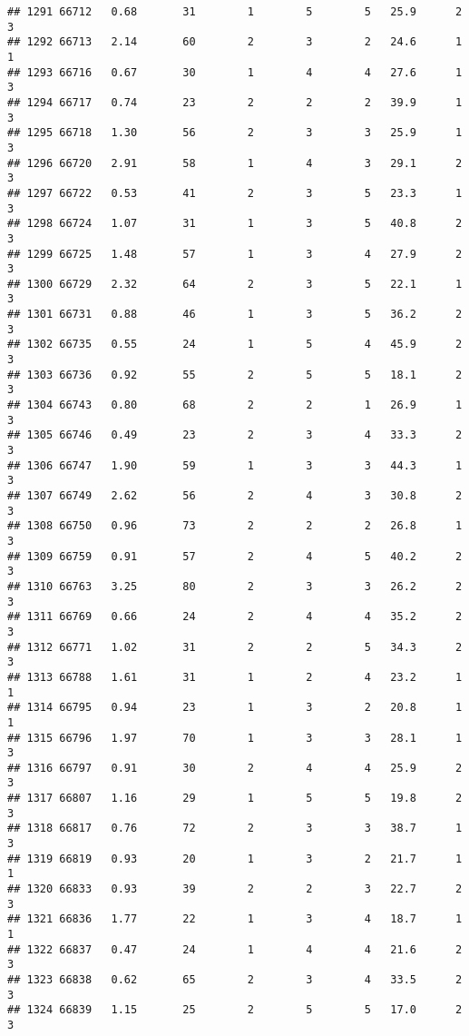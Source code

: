 \documentclass[
]{article}
\begin{document}
\begin{verbatim}
## 1291 66712   0.68       31        1        5        5   25.9      2      3
## 1292 66713   2.14       60        2        3        2   24.6      1      1
## 1293 66716   0.67       30        1        4        4   27.6      1      3
## 1294 66717   0.74       23        2        2        2   39.9      1      3
## 1295 66718   1.30       56        2        3        3   25.9      1      3
## 1296 66720   2.91       58        1        4        3   29.1      2      3
## 1297 66722   0.53       41        2        3        5   23.3      1      3
## 1298 66724   1.07       31        1        3        5   40.8      2      3
## 1299 66725   1.48       57        1        3        4   27.9      2      3
## 1300 66729   2.32       64        2        3        5   22.1      1      3
## 1301 66731   0.88       46        1        3        5   36.2      2      3
## 1302 66735   0.55       24        1        5        4   45.9      2      3
## 1303 66736   0.92       55        2        5        5   18.1      2      3
## 1304 66743   0.80       68        2        2        1   26.9      1      3
## 1305 66746   0.49       23        2        3        4   33.3      2      3
## 1306 66747   1.90       59        1        3        3   44.3      1      3
## 1307 66749   2.62       56        2        4        3   30.8      2      3
## 1308 66750   0.96       73        2        2        2   26.8      1      3
## 1309 66759   0.91       57        2        4        5   40.2      2      3
## 1310 66763   3.25       80        2        3        3   26.2      2      3
## 1311 66769   0.66       24        2        4        4   35.2      2      3
## 1312 66771   1.02       31        2        2        5   34.3      2      3
## 1313 66788   1.61       31        1        2        4   23.2      1      1
## 1314 66795   0.94       23        1        3        2   20.8      1      1
## 1315 66796   1.97       70        1        3        3   28.1      1      3
## 1316 66797   0.91       30        2        4        4   25.9      2      3
## 1317 66807   1.16       29        1        5        5   19.8      2      3
## 1318 66817   0.76       72        2        3        3   38.7      1      3
## 1319 66819   0.93       20        1        3        2   21.7      1      1
## 1320 66833   0.93       39        2        2        3   22.7      2      3
## 1321 66836   1.77       22        1        3        4   18.7      1      1
## 1322 66837   0.47       24        1        4        4   21.6      2      3
## 1323 66838   0.62       65        2        3        4   33.5      2      3
## 1324 66839   1.15       25        2        5        5   17.0      2      3

\end{verbatim}
\end{document}
